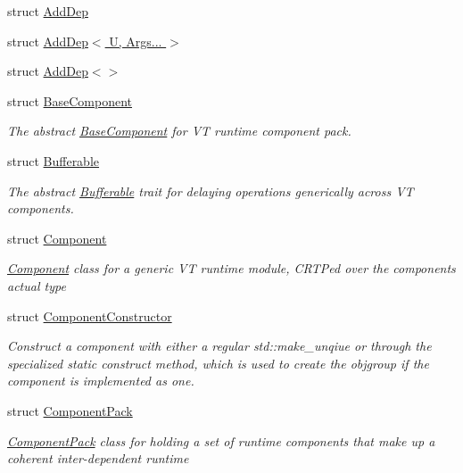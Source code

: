 \begin{DoxyCompactItemize}
\item 
struct \hyperlink{structvt_1_1runtime_1_1component_1_1_add_dep}{Add\+Dep}
\item 
struct \hyperlink{structvt_1_1runtime_1_1component_1_1_add_dep_3_01_u_00_01_args_8_8_8_01_4}{Add\+Dep$<$ U, Args... $>$}
\item 
struct \hyperlink{structvt_1_1runtime_1_1component_1_1_add_dep_3_4}{Add\+Dep$<$$>$}
\item 
struct \hyperlink{structvt_1_1runtime_1_1component_1_1_base_component}{Base\+Component}
\begin{DoxyCompactList}\small\item\em The abstract {\ttfamily \hyperlink{structvt_1_1runtime_1_1component_1_1_base_component}{Base\+Component}} for VT runtime component pack. \end{DoxyCompactList}\item 
struct \hyperlink{structvt_1_1runtime_1_1component_1_1_bufferable}{Bufferable}
\begin{DoxyCompactList}\small\item\em The abstract {\ttfamily \hyperlink{structvt_1_1runtime_1_1component_1_1_bufferable}{Bufferable}} trait for delaying operations generically across VT components. \end{DoxyCompactList}\item 
struct \hyperlink{structvt_1_1runtime_1_1component_1_1_component}{Component}
\begin{DoxyCompactList}\small\item\em {\ttfamily \hyperlink{structvt_1_1runtime_1_1component_1_1_component}{Component}} class for a generic VT runtime module, C\+R\+TP\textquotesingle{}ed over the component\textquotesingle{}s actual type \end{DoxyCompactList}\item 
struct \hyperlink{structvt_1_1runtime_1_1component_1_1_component_constructor}{Component\+Constructor}
\begin{DoxyCompactList}\small\item\em Construct a component with either a regular {\ttfamily std\+::make\+\_\+unqiue} or through the specialized static {\ttfamily construct} method, which is used to create the objgroup if the component is implemented as one. \end{DoxyCompactList}\item 
struct \hyperlink{structvt_1_1runtime_1_1component_1_1_component_pack}{Component\+Pack}
\begin{DoxyCompactList}\small\item\em {\ttfamily \hyperlink{structvt_1_1runtime_1_1component_1_1_component_pack}{Component\+Pack}} class for holding a set of runtime components that make up a coherent inter-\/dependent runtime \end{DoxyCompactList}\item 

\end{DoxyCompactItemize}
